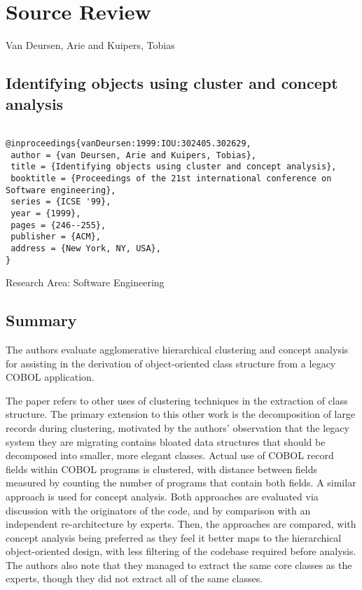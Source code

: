 \documentclass{article}
\begin{document}
\section*{Source Review}
\noindent
Van Deursen, Arie and Kuipers, Tobias

\noindent
\subsection*{Identifying objects using cluster and concept analysis}

\begin{verbatim}

@inproceedings{vanDeursen:1999:IOU:302405.302629,
 author = {van Deursen, Arie and Kuipers, Tobias},
 title = {Identifying objects using cluster and concept analysis},
 booktitle = {Proceedings of the 21st international conference on Software engineering},
 series = {ICSE '99},
 year = {1999},
 pages = {246--255},
 publisher = {ACM},
 address = {New York, NY, USA},
}
\end{verbatim}

\noindent
Research Area: Software Engineering

\subsection*{Summary}
The authors evaluate agglomerative hierarchical clustering and concept analysis for assisting in the derivation of object-oriented class structure from a legacy COBOL application.

\vspace{\baselineskip}
 
The paper refers to other uses of clustering techniques in the extraction of class structure. The primary extension to this other work is the decomposition of large records during clustering, motivated by the authors' observation that the legacy system they are migrating contains bloated data structures that should be decomposed into smaller, more elegant classes. Actual use of COBOL record fields within COBOL programs is clustered, with distance between fields measured by counting the number of programs that contain both fields. A similar approach is used for concept analysis. Both approaches are evaluated via discussion with the originators of the code, and by comparison with an independent re-architecture by experts. Then, the approaches are compared, with concept analysis being preferred as they feel it better maps to the hierarchical object-oriented design, with less filtering of the codebase required before analysis. The authors also note that they managed to extract the same core classes as the experts, though they did not extract all of the same classes.
 
\end{document}
